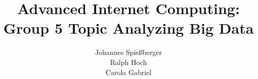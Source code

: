 \documentclass{sig-alternate}
\begin{document}
%

\title{Advanced Internet Computing: Group 5 Topic Analyzing Big Data}
%
%
%
%
%

%
\author{
%
%
\alignauthor
Johannes Spie{\ss}berger\\
\alignauthor
Ralph Hoch\\
\alignauthor 
Carola Gabriel\\
}
\end{document}
